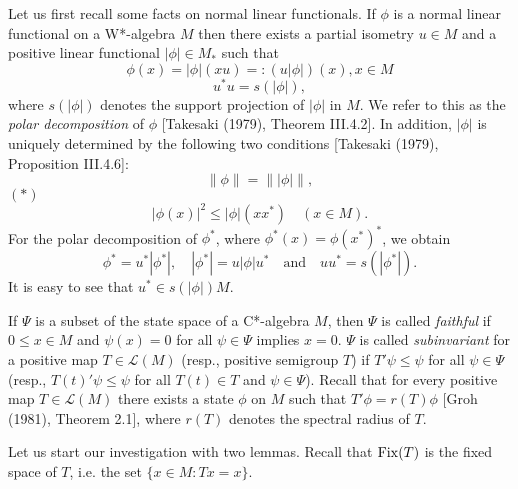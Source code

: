 
Let us first recall some facts on normal linear functionals.
If $\phi$ is a normal linear functional on a W*-algebra $M$ then there exists a partial isometry $u\in M$ and a positive linear functional $|\phi|\in M_{*}$ such that
\[
\phi(x) = |\phi|(xu) =: (u|\phi|)(x), x\in M
\]
\[
u^*u = s(|\phi|),
\]
where $s(|\phi|)$ denotes the support projection of $|\phi|$ in $M$.
We refer to this as the \emph{polar decomposition} of $\phi$ [Takesaki (1979), Theorem III.4.2].
In addition, $|\phi|$ is uniquely determined by the following two conditions [Takesaki (1979), Proposition III.4.6]:
\[
	\|\phi\| = \| |\phi| \|,
\]
$(*)$ 
\[
	|\phi(x)|^{2} \leq |\phi|(xx^*) \quad (x\in M).
\]
For the polar decomposition of $\phi^*$, where $\phi^*(x) = \phi(x^*)^*$, we obtain
\[
	\phi^* = u^*|\phi^*|, \quad |\phi^*| = u|\phi|u^* \quad \text{and} \quad 		uu^* = s(|\phi^*|).
\]
It is easy to see that $u^*\in s(|\phi|)M$.

If $\Psi$ is a subset of the state space of a C*-algebra $M$, then $\Psi$ is called \emph{faithful} if $0 \leq x\in M$ and $\psi(x) = 0$ for all $\psi\in\Psi$ implies $x = 0$.
$\Psi$ is called \emph{subinvariant} for a positive map $T\in\mathcal{L}(M)$ (resp., positive semigroup $T$) if $T'\psi \leq \psi$ for all $\psi\in\Psi$ (resp., $T(t)'\psi \leq \psi$ for all $T(t)\in T$ and $\psi\in\Psi$).
Recall that for every positive map $T\in\mathcal{L}(M)$ there exists a state $\phi$ on $M$ such that $T'\phi = r(T)\phi$ [Groh (1981), Theorem 2.1], where $r(T)$ denotes the spectral radius of $T$.

Let us start our investigation with two lemmas.
Recall that $\mathrm{Fix}(T)$ is the fixed space of $T$, i.e. the set $\{x\in M: Tx=x\}$.


